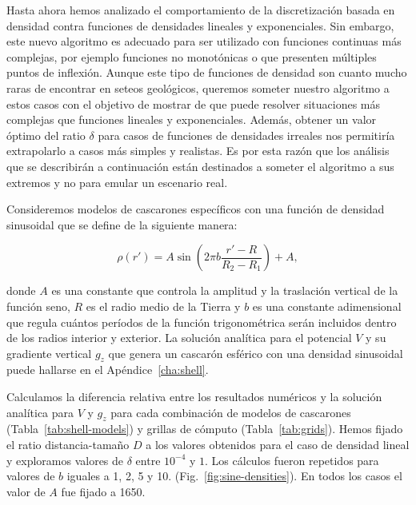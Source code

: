 Hasta ahora hemos analizado el comportamiento de la discretización basada en
densidad contra funciones de densidades lineales y exponenciales.
Sin embargo, este nuevo algoritmo es adecuado para ser utilizado con funciones
continuas más complejas, por ejemplo funciones no monotónicas o que presenten
múltiples puntos de inflexión.
Aunque este tipo de funciones de densidad son cuanto mucho raras de encontrar
en seteos geológicos, queremos someter nuestro algoritmo a estos casos con el
objetivo de mostrar de que puede resolver situaciones más complejas que
funciones lineales y exponenciales.
Además, obtener un valor óptimo del ratio $\delta$ para casos de funciones de
densidades irreales nos permitiría extrapolarlo a casos más simples
y realistas.
Es por esta razón que los análisis que se describirán a continuación están
destinados a someter el algoritmo a sus extremos y no para emular un escenario
real.

Consideremos modelos de cascarones específicos con una función de densidad
sinusoidal que se define de la siguiente manera:

\begin{equation}
    \rho(r') = A \sin \left( 2 \pi b \frac{r' - R}{R_2 - R_1} \right) + A,
    \label{eq:density-sine}
\end{equation}

\noindent donde $A$ es una constante que controla la amplitud y la traslación
vertical de la función seno, $R$ es el radio medio de la Tierra y $b$ es una
constante adimensional que regula cuántos períodos de la función trigonométrica
serán incluidos dentro de los radios interior y exterior.
La solución analítica para el potencial $V$ y su gradiente vertical $g_z$ que
genera un cascarón esférico con una densidad sinusoidal puede hallarse en el
Apéndice~\ref{cha:shell}.

Calculamos la diferencia relativa entre los resultados numéricos y la solución
analítica para $V$ y $g_z$ para cada combinación de modelos de cascarones
(Tabla~\ref{tab:shell-models}) y grillas de cómputo (Tabla~\ref{tab:grids}).
Hemos fijado el ratio distancia-tamaño $D$ a los valores obtenidos para el caso
de densidad lineal y exploramos valores de $\delta$ entre $10^{-4}$ y $1$. Los
cálculos fueron repetidos para valores de $b$ iguales a 1, 2, 5 y 10.
(Fig.~\ref{fig:sine-densities}). En todos los casos el valor de $A$ fue fijado
a 1650\kgpercubicm{}.

